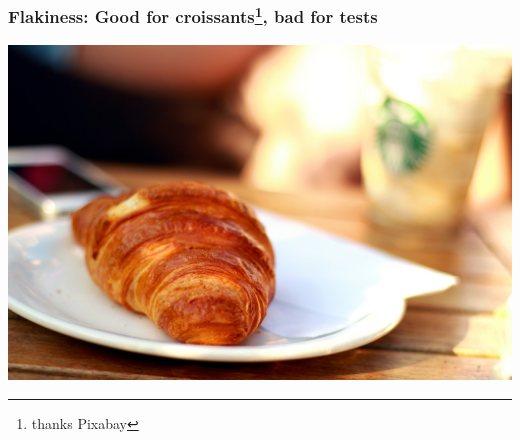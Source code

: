 \documentclass{beamer}
\begin{document}
\begin{frame}
  \frametitle{Flakiness: Good for croissants\footnote{thanks Pixabay}, bad for tests}
  \includegraphics[width=\textwidth]{L24/croissant-410322_1920.jpg}
\end{frame}
\end{document}
